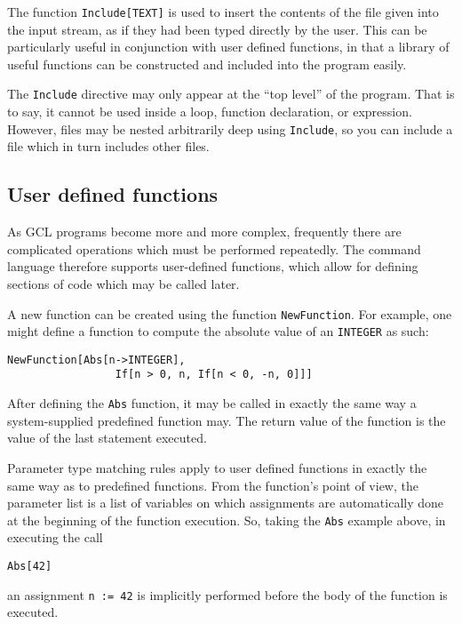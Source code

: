 The function {\tt Include[TEXT]} is used to insert the contents of the file
given into the input stream, as if they had been typed directly by the user.
This can be particularly useful in conjunction with user defined functions, in that
a library of useful functions can be constructed and included into the program
easily.

The {\tt Include} directive may only appear at the ``top level'' of the
program.  That is to say, it cannot be used inside a loop, function declaration, or expression.  However, files may be nested arbitrarily deep using
{\tt Include}, so you can include a file which in turn includes other files.
  
\subsection{User defined functions}

As GCL programs become more and more complex, frequently there are complicated
operations which must be performed repeatedly.  The command language therefore
supports user-defined functions, which allow for defining sections of code
which may be called later.

A new function can be created using the function
\verb+NewFunction+.  For example, one might define a function to compute
the absolute value of an {\tt INTEGER} as such:

\begin{verbatim}
NewFunction[Abs[n->INTEGER],
                 If[n > 0, n, If[n < 0, -n, 0]]]
\end{verbatim}

\noindent After defining the \verb+Abs+ function, it may be called in exactly
the same way a system-supplied predefined function may.  The return value
of the function is the value of the last statement executed. 

Parameter type matching rules apply to user defined functions in exactly the
same way as to predefined functions.  From the function's point of view,
the parameter list is a list of variables on which assignments are
automatically done at the beginning of the function execution.  So, taking
the \verb+Abs+ example above, in executing the call

\begin{verbatim}
Abs[42]
\end{verbatim}

\noindent an assignment \verb+n := 42+ is implicitly performed before the
body of the function is executed.

